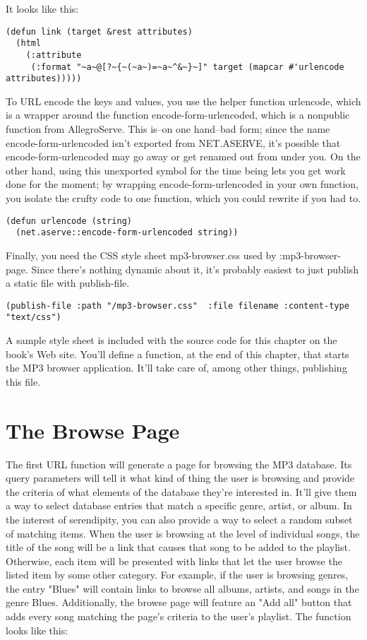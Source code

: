 It looks like this:

\begin{lstlisting}
(defun link (target &rest attributes)
  (html 
    (:attribute
     (:format "~a~@[?~{~(~a~)=~a~^&~}~]" target (mapcar #'urlencode attributes)))))
\end{lstlisting}

To URL encode the keys and values, you use the helper function urlencode, which is a
wrapper around the function encode-form-urlencoded, which is a nonpublic function from
AllegroServe. This is--on one hand--bad form; since the name encode-form-urlencoded isn't
exported from NET.ASERVE, it's possible that encode-form-urlencoded may go away or get
renamed out from under you. On the other hand, using this unexported symbol for the time
being lets you get work done for the moment; by wrapping encode-form-urlencoded in your
own function, you isolate the crufty code to one function, which you could rewrite if you
had to.

\begin{lstlisting}
(defun urlencode (string)
  (net.aserve::encode-form-urlencoded string))
\end{lstlisting}

Finally, you need the CSS style sheet mp3-browser.css used by :mp3-browser-page. Since
there's nothing dynamic about it, it's probably easiest to just publish a static file with
publish-file.

\begin{lstlisting}
(publish-file :path "/mp3-browser.css"  :file filename :content-type "text/css")
\end{lstlisting}

A sample style sheet is included with the source code for this chapter on the book's Web
site. You'll define a function, at the end of this chapter, that starts the MP3 browser
application. It'll take care of, among other things, publishing this file.

\section{The Browse Page}

The first URL function will generate a page for browsing the MP3 database. Its query
parameters will tell it what kind of thing the user is browsing and provide the criteria
of what elements of the database they're interested in. It'll give them a way to select
database entries that match a specific genre, artist, or album. In the interest of
serendipity, you can also provide a way to select a random subset of matching items. When
the user is browsing at the level of individual songs, the title of the song will be a
link that causes that song to be added to the playlist. Otherwise, each item will be
presented with links that let the user browse the listed item by some other category. For
example, if the user is browsing genres, the entry "Blues" will contain links to browse
all albums, artists, and songs in the genre Blues. Additionally, the browse page will
feature an "Add all" button that adds every song matching the page's criteria to the
user's playlist. The function looks like this:

